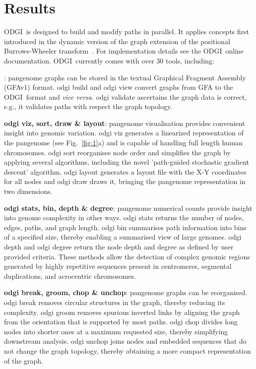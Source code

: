 \documentclass{bioinfo}
\newcommand{\odgi}{ODGI}
\newcommand{\cmd}[1]{\textrm{#1}}
\newcommand{\cmdbf}[1]{{\textbf{#1}}}
\newcommand{\topic}[1]{{\cmdbf{#1}}:}
\begin{document}
    \section{Results}

    \odgi\ is designed to build and modify paths in parallel. It
    applies concepts first introduced in the dynamic version of the
    graph extension of the positional Burrows-Wheeler
    transform~\citep{Siren:2020}. For implementation details see the
    \odgi\ online documentation. \odgi\ currently comes with over 30
    tools, including:

    \indent \topic{odgi build, view \& validate} pangenome graphs can be
    stored in the textual Graphical Fragment Assembly
    (GFAv1) format\citep{GFA}. \cmd{odgi build} and \cmd{odgi view}
    convert graphs from GFA to the \odgi\ format and \textit{vice versa}.
    \cmd{odgi validate} ascertains the graph data is correct, e.g.,
    it validates paths with respect the graph topology.

    \topic{odgi viz, sort, draw \& layout} pangenome visualisation
    provides convenient insight into genomic variation. \cmd{odgi viz}
    generates a linearized representation of the pangenome (see Fig.~\ref{fig:1}a)
    and is capable of handling full length human chromosomes. \cmd{odgi sort}
    reorganises node order and simplifies the graph by applying several
    algorithms, including the novel 'path-guided stochastic gradient descent'
    algorithm. \cmd{odgi layout} generates a layout file with the X-Y
    coordinates for all nodes and \cmd{odgi draw} draws it, bringing
    the pangenome representation in two dimensions.

    \topic{odgi stats, bin, depth \& degree} pangenome numerical
    counts provide insight into genome complexity in other
    ways. \cmd{odgi stats} returns the number of nodes,
    edges, paths, and graph length. \cmd{odgi bin} summarises path
    information into bins of a specified size, thereby enabling a
    summarised view of large genomes. \cmd{odgi depth} and
    \cmd{odgi degree} return the node depth and degree as defined by
    user provided criteria. These methods allow the detection of complex
    genomic regions generated by highly repetitive sequences present in
    centromeres, segmental duplications, and acrocentric chromosomes.

    \topic{odgi break, groom, chop \& unchop} pangenome graphs can be
    reorganised. \cmd{odgi break} removes circular structures in the
    graph, thereby reducing its complexity. \cmd{odgi groom} removes
    spurious inverted links by aligning the graph from the orientation
    that is supported by most paths. \cmd{odgi chop} divides long
    nodes into shorter ones at a maximum requested size, thereby
    simplifying downstream analysis. \cmd{odgi unchop} joins nodes
    and embedded sequences that do not change the graph topology,
    thereby obtaining a more compact representation of the graph.
\end{document}
